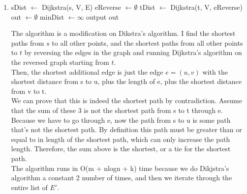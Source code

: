 
\usepackage{amsmath, verbatim, tikz, float, pgfplots, framed}
\usepackage[]{algorithm2e}

\usetikzlibrary{arrows,automata}

\oddsidemargin 0in
\evensidemargin 0in
\textwidth 6.5in
\topmargin -0.5in
\textheight 9.0in
\newcommand{\norm}[1]{\left\lVert #1 \right\rVert}


\pagestyle{myheadings}

\begin{enumerate}
\item
  \begin{algorithm}[H]
    sDist $\gets$ Dijkstra(s, V, E)\;
    eReverse $\gets \emptyset$\;
    tDist $\gets$ Dijkstra(t, V, eReverse)\;
    out $\gets \emptyset$\;
    minDist $\gets \infty$\;
    output out\;    
  \end{algorithm}

  The algorithm is a modification on Dikstra's algorithm. I find the shortest paths from $s$ to all other points, and the shortest paths from all other points to $t$ by reversing the edges in the graph and running Dijkstra's algorithm on the reversed graph starting from $t$.\\
  
  Then, the shortest additional edge is just the edge $e = (u,v)$ with the shortest distance from s to u, plus the length of e, plus the shortest distance from v to t.\\

  We can prove that this is indeed the shortest path by contradiction. Assume that the sum of these 3 is not the shortest path from s to t through e. Because we have to go through e, now the path from s to u is some path that's not the shortest path. By definition this path must be greater than or equal to in length of the shortest path, which can only increase the path length. Therefore, the sum above is the shortest, or a tie for the shortest path.\\

  The algorithm runs in O(m + nlogn + k) time because we do Dikjstra's algorithm a constant 2 number of times, and then we iterate through the entire list of $E'$.

\end{enumerate}
